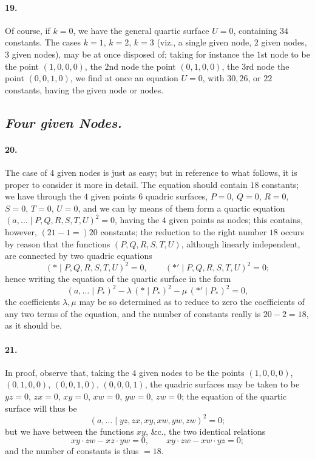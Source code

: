 \documentclass[11pt,a4paper]{article}
\begin{document}
\paragraph{19.}
Of course, if $k = 0$, we have the general quartic surface $U = 0$, containing $34$
constants. The cases $k = 1$, $k = 2$, $k = 3$ (viz., a single given node, $2$ given nodes,
$3$ given nodes), may be at once disposed of; taking for instance the $1$st node to be the
point $(1, 0, 0, 0)$, the $2$nd node the point $(0, 1, 0, 0)$, the $3$rd node the point
$(0, 0, 1, 0)$, we find at once an equation $U = 0$, with $30, 26$, or $22$ constants,
having the given node or nodes.

\subsection*{\textit{Four given Nodes.}}

\paragraph{20.}
The case of $4$ given nodes is just as easy; but in reference to what follows, it is proper
to consider it more in detail. The equation should contain $18$ constants; we have through
the $4$ given points $6$ quadric surfaces, $P = 0$, $Q = 0$, $R = 0$, $S = 0$, $T = 0$,
$U = 0$, and we can by means of them form a quartic equation
$(a, \ldots  \mid P, Q, R, S, T, U)^2 = 0$, having the $4$ given points as nodes;
this contains, however, $(21 - 1 =) 20$ constants; the reduction to the right number $18$
occurs by reason that the functions $(P, Q, R, S, T, U)$, although linearly independent,
are connected by two quadric equations
\[
(* \mid P, Q, R, S, T, U)^2 = 0,\qquad (*' \mid P, Q, R, S, T, U)^2 = 0;
\]
hence writing the equation of the quartic surface in the form
\[
(a, \ldots  \mid P_*)^2 - \lambda\,(* \mid P_*)^2 - \mu\,(*' \mid P_*)^2 = 0,
\]
the coefficients $\lambda, \mu$ may be so determined as to reduce to zero the coefficients
of any two terms of the equation, and the number of constants really is $20 - 2 = 18$, as
it should be.

\paragraph{21.}
In proof, observe that, taking the $4$ given nodes to be the points $(1, 0, 0, 0)$,
$(0, 1, 0, 0)$, $(0, 0, 1, 0)$, $(0, 0, 0, 1)$, the quadric surfaces may be taken to be
$yz = 0$, $zx = 0$, $xy = 0$, $xw = 0$, $yw = 0$, $zw = 0$; the equation of the quartic
surface will thus be
\[
(a, \ldots  \mid yz, zx, xy, xw, yw, zw)^2 = 0;
\]
but we have between the functions $xy$, \&c., the two identical relations
\[
xy \cdot zw - xz \cdot yw = 0,\qquad xy \cdot zw - xw \cdot yz = 0;
\]
and the number of constants is thus $= 18$.
\end{document}
